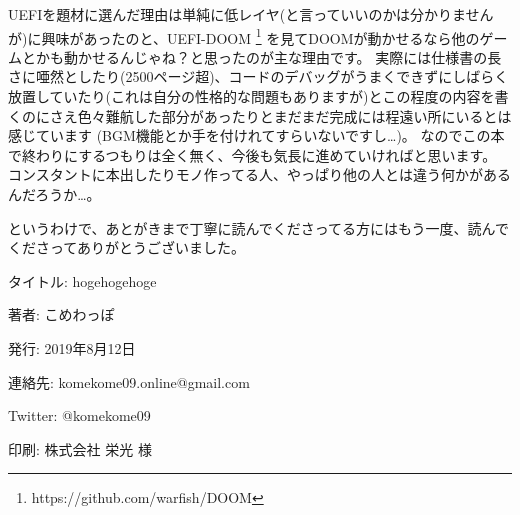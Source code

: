 \documentclass[10pt,b5paper,twoside,openany]{ltjsbook}
\begin{document}
UEFIを題材に選んだ理由は単純に低レイヤ(と言っていいのかは分かりませんが)に興味があったのと、UEFI-DOOM
\footnote{https://github.com/warfish/DOOM}
を見てDOOMが動かせるなら他のゲームとかも動かせるんじゃね？と思ったのが主な理由です。
実際には仕様書の長さに唖然としたり(2500ページ超)、コードのデバッグがうまくできずにしばらく放置していたり(これは自分の性格的な問題もありますが)とこの程度の内容を書くのにさえ色々難航した部分があったりとまだまだ完成には程遠い所にいるとは感じています
(BGM機能とか手を付けれてすらいないですし…)。
なのでこの本で終わりにするつもりは全く無く、今後も気長に進めていければと思います。
コンスタントに本出したりモノ作ってる人、やっぱり他の人とは違う何かがあるんだろうか…。

というわけで、あとがきまで丁寧に読んでくださってる方にはもう一度、読んでくださってありがとうございました。
\newpage

\thispagestyle{empty}
\printbibliography[title=参考文献]
\newpage

\thispagestyle{empty}
\begin{flushright}
    \begin{minipage}{0.8\hsize}
        \begin{description}
            \item{タイトル: } hogehogehoge
            \item{著者: }こめわっぽ
            \item{発行: }2019年8月12日
            \item{連絡先: }komekome09.online@gmail.com
            \item{Twitter: }@komekome09
            \item{印刷: }株式会社 栄光 様
        \end{description}
    \end{minipage}
\end{flushright}
\newpage

\thispagestyle{empty}
\mbox{}
\newpage
\end{document}
